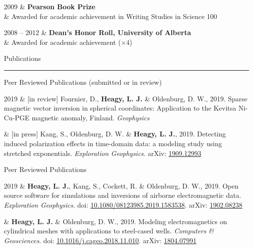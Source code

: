 \documentclass[a4paper, 11pt]{article}
\newcommand{\arxiv}[1]{arXiv: \href{https://arxiv.org/abs/#1}{#1}}
\newcommand{\doi}[1]{doi: \href{https://doi.org/#1}{#1}}
\newcommand{\heading}[1]{
    \begin{minipage}[t]{\textwidth}
    \vspace{0.05cm}
    {\LARGE #1}\\
    \vspace{-0.24cm}
    \hrule
    \end{minipage}
    \vspace{0.05cm}

}
\newcommand{\subheading}[1]{
    \vspace{0.4cm}
    {\Large #1}\\
    \vspace{-0.2cm}
}
\begin{document}
\begin{entryright}
2009 & \textbf{Pearson Book Prize}\\
& Awarded for academic achievement in Writing Studies in Science 100
\end{entryright}

\begin{entryright}
2008 -- 2012 & \textbf{Dean's Honor Roll, University of Alberta} \\
& Awarded for academic achievement ($\times 4$)
\end{entryright}

\heading{Publications}
\label{sec:publications}

% 
% 

\subheading{Peer Reviewed Publications (submitted or in review)}

\begin{entryright}
2019 & [in review] Fournier, D., \textbf{Heagy, L. J.} \& Oldenburg, D. W., 2019. Sparse magnetic vector inversion in spherical coordinates: Application to the Kevitsa Ni-Cu-PGE magnetic anomaly, Finland. \emph{Geophysics}
\end{entryright}

\begin{entryright}
& [in press] Kang, S., Oldenburg, D. W. \& \textbf{Heagy, L. J.}, 2019. Detecting induced polarization effects in time-domain data: a modeling study using stretched exponentials. \emph{Exploration Geophysics}. \arxiv{1909.12993}
\end{entryright}


\subheading{Peer Reviewed Publications}

\begin{entryright}
2019 & \textbf{Heagy, L. J.}, Kang, S., Cockett, R. \& Oldenburg, D. W., 2019. Open source software for simulations and inversions of airborne electromagnetic data. \emph{Exploration Geophysics}. \doi{10.1080/08123985.2019.1583538}. \arxiv{1902.08238}
\end{entryright}

\begin{entryright}
& \textbf{Heagy, L. J.} \& Oldenburg, D. W., 2019. Modeling electromagnetics on cylindrical meshes with applications to steel-cased wells. \emph{Computers \& Geosciences}. \doi{10.1016/j.cageo.2018.11.010}. \arxiv{1804.07991}
\end{entryright}
\end{document}
